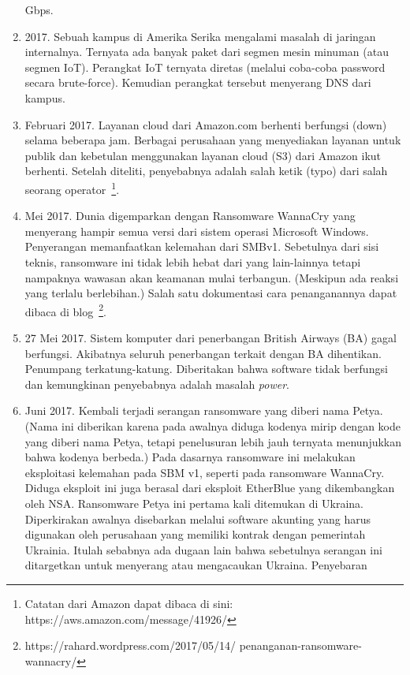 \begin{enumerate}
   Gbps.
\item 2017.
   Sebuah kampus di Amerika Serika mengalami masalah di jaringan internalnya.
      Ternyata ada banyak paket dari segmen mesin minuman (atau segmen IoT).
      Perangkat IoT ternyata diretas (melalui coba-coba password secara
      brute-force). Kemudian perangkat tersebut menyerang DNS dari kampus.
\item Februari 2017. 
   Layanan cloud dari Amazon.com berhenti berfungsi (down) selama beberapa jam.
      Berbagai perusahaan yang menyediakan layanan untuk publik dan kebetulan
      menggunakan layanan cloud (S3) dari Amazon ikut berhenti. Setelah
      diteliti, penyebabnya adalah salah ketik (typo) dari salah seorang
      operator~\footnote{Catatan dari Amazon dapat dibaca di sini: https://aws.amazon.com/message/41926/}.
   \item Mei 2017. Dunia digemparkan dengan Ransomware WannaCry yang menyerang
      hampir semua versi dari sistem operasi Microsoft Windows. Penyerangan
      memanfaatkan kelemahan dari SMBv1. Sebetulnya dari sisi teknis,
      ransomware ini tidak lebih hebat dari yang lain-lainnya tetapi nampaknya
      wawasan akan keamanan mulai terbangun. (Meskipun ada reaksi yang terlalu
      berlebihan.) Salah satu dokumentasi cara penanganannya dapat dibaca di
      blog~\cite{brwannacry}\footnote{https://rahard.wordpress.com/2017/05/14/
      penanganan-ransomware-wannacry/}.
\item 27 Mei 2017. Sistem komputer dari penerbangan British Airways (BA) gagal
   berfungsi. Akibatnya seluruh penerbangan terkait dengan BA dihentikan.
      Penumpang terkatung-katung. Diberitakan bahwa software tidak berfungsi
      dan kemungkinan penyebabnya adalah masalah {\em power}.
   \item Juni 2017. Kembali terjadi serangan ransomware yang diberi nama Petya.
      (Nama ini diberikan karena pada awalnya diduga kodenya mirip dengan kode
      yang diberi nama Petya, tetapi penelusuran lebih jauh ternyata
      menunjukkan bahwa kodenya berbeda.) Pada dasarnya ransomware ini
      melakukan eksploitasi kelemahan pada SBM v1, seperti pada ransomware
      WannaCry. Diduga eksploit ini juga berasal dari eksploit EtherBlue yang
      dikembangkan oleh NSA. Ransomware Petya ini pertama kali ditemukan di
      Ukraina. Diperkirakan awalnya disebarkan melalui software akunting yang
      harus digunakan oleh perusahaan yang memiliki kontrak dengan pemerintah
      Ukrainia. Itulah sebabnya ada dugaan lain bahwa sebetulnya serangan ini
      ditargetkan untuk menyerang atau mengacaukan Ukraina. Penyebaran

\end{enumerate}
